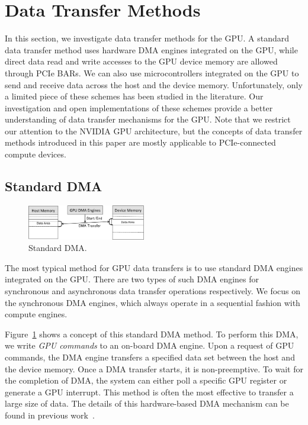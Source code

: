 \section{Data Transfer Methods}
\label{sec:data_transfer_methods}

In this section, we investigate data transfer methods for the GPU.
A standard data transfer method uses hardware DMA engines integrated on
the GPU, while direct data read and write accesses to the GPU device
memory are allowed through PCIe BARs.
We can also use microcontrollers integrated on the GPU to send and
receive data across the host and the device memory.
Unfortunately, only a limited piece of these schemes has been studied in
the literature.
Our investigation and open implementations of these schemes provide a
better understanding of data transfer mechanisms for the GPU.
Note that we restrict our attention to the NVIDIA GPU architecture, but
the concepts of data transfer methods introduced in this paper are
mostly applicable to PCIe-connected compute devices.

\subsection{Standard DMA}
\label{sec:dma}

\begin{figure}[!t]
 \centering
 \includegraphics[width=0.46\textwidth]{figure/Method/DMA_Method.pdf}
 \caption{Standard DMA.}
 \label{fig:dma}
\end{figure}

The most typical method for GPU data transfers is to use standard DMA
engines integrated on the GPU.
There are two types of such DMA engines for synchronous and asynchronous
data transfer operations respectively.
We focus on the synchronous DMA engines, which always operate in a
sequential fashion with compute engines.

Figure~\ref{fig:dma} shows a concept of this standard DMA method.
To perform this DMA, we write \textit{GPU commands} to an on-board DMA
engine.
Upon a request of GPU commands, the DMA engine transfers a specified
data set between the host and the device memory.
Once a DMA transfer starts, it is non-preemptive.
To wait for the completion of DMA, the system can either poll a specific
GPU register or generate a GPU interrupt.
This method is often the most effective to transfer a large size of
data.
The details of this hardware-based DMA mechanism can be found in
previous work~\cite{Kato_ATC11, Kato_ATC12}.

